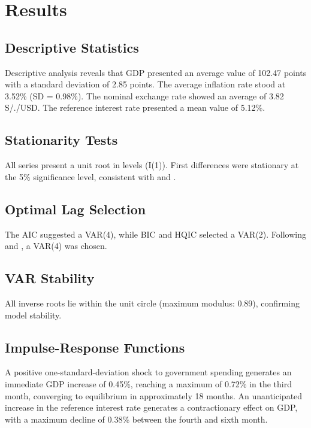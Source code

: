 \documentclass[12pt, a4paper]{article}
\begin{document}
\section{Results}

\subsection{Descriptive Statistics}

Descriptive analysis reveals that GDP presented an average value of 102.47 points with a standard deviation of 2.85 points. The average inflation rate stood at 3.52\% (SD = 0.98\%). The nominal exchange rate showed an average of 3.82 S/./USD. The reference interest rate presented a mean value of 5.12\%.

\subsection{Stationarity Tests}

All series present a unit root in levels (I(1)). First differences were stationary at the 5\% significance level, consistent with \citet{nelson1982} and \citet{perron1989}.

\subsection{Optimal Lag Selection}

The AIC suggested a VAR(4), while BIC and HQIC selected a VAR(2). Following \citet{lutkepohl2005} and \citet{kilian2017}, a VAR(4) was chosen.

\subsection{VAR Stability}

All inverse roots lie within the unit circle (maximum modulus: 0.89), confirming model stability.

\subsection{Impulse-Response Functions}

A positive one-standard-deviation shock to government spending generates an immediate GDP increase of 0.45\%, reaching a maximum of 0.72\% in the third month, converging to equilibrium in approximately 18 months. An unanticipated increase in the reference interest rate generates a contractionary effect on GDP, with a maximum decline of 0.38\% between the fourth and sixth month.
\end{document}
